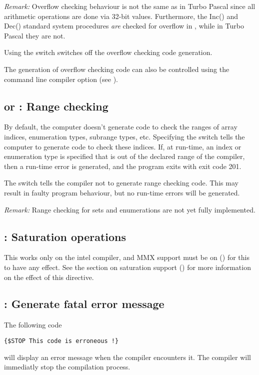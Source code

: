 \documentclass{report}
\begin{document}
\emph{ Remark: } Overflow checking behaviour is not the same as in
Turbo Pascal since all arithmetic operations are done via 32-bit
values. Furthermore, the Inc() and Dec() standard system procedures
\emph{ are } checked for overflow in \fpc, while in Turbo Pascal they
are not.

Using the  switch switches off the overflow checking code
generation.

The generation of overflow checking code can also be controlled
using the  command line compiler option (see \userref).

\subsection{ or  : Range checking}
By default, the computer doesn't generate code to check the ranges of array
indices, enumeration types, subrange types, etc. Specifying the
 switch tells the computer to generate code to check these
indices. If, at run-time, an index or enumeration type is specified that is
out of the declared range of the compiler, then a run-time error is
generated, and the program exits with exit code 201.

The  switch tells the compiler not to generate range checking
code. This may result in faulty program behaviour, but no run-time errors
will be generated.

{\em Remark: } Range checking for sets and enumerations are not yet fully
implemented.

\subsection{ : Saturation operations}
This works only on the intel compiler, and MMX support must be on
() for this to have any effect. See the section on
saturation support () for more information 
on the effect of this directive.

\subsection{ : Generate fatal error message}

The following code
\begin{verbatim}
{$STOP This code is erroneous !}
\end{verbatim}
will display an error message when the compiler encounters it.
The compiler will immediatly stop the compilation process.
\end{document}
